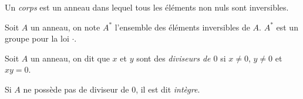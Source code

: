 \documentclass[french, a4paper, 11pt, twocolumn]{article}
\begin{document}
\begin{definition}
  Un \emph{corps} est un anneau dans lequel tous les éléments non nuls sont inversibles.

  Soit $A$ un anneau, on note $A^{*}$ l'ensemble des éléments inversibles de $A$. $A^{*}$ est un groupe pour la loi $\cdot$.
\end{definition}

\begin{definition}
  Soit $A$ un anneau, on dit que $x$ et $y$ sont des \emph{diviseurs de $0$} si $x\neq 0$, $y\neq 0$ et $xy=0$.

  Si $A$ ne possède pas de diviseur de $0$, il est dit \emph{intègre}.
\end{definition}
\end{document}
